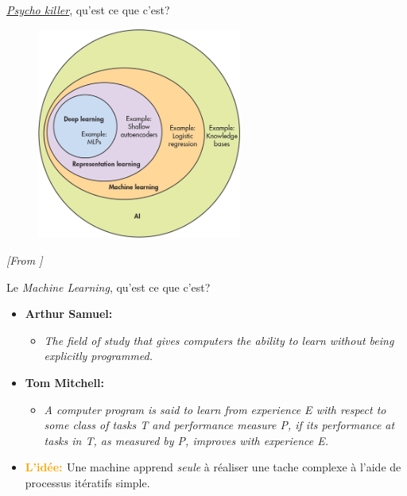 \documentclass[11pt]{beamer}
\begin{document}
\begin{frame}{\underline{\href{https://www.youtube.com/watch?v=O52jAYa4Pm8}{\textit{Psycho killer}}}, qu'est ce que c'est?}
  \begin{figure}
    \includegraphics[width=0.6\textwidth]{figs/aiVennDiagram.png}
  \end{figure}
  \tiny
  \vspace{-1cm}
  \textit{[From \href{http://www.deeplearningbook.org/}{\color{blue}{MIT Press book Deep Learning}}]}
\end{frame}


\begin{frame}{Le \textit{Machine Learning}, qu'est ce que c'est?}

  \begin{itemize}
  \item \textbf{Arthur Samuel:}
    \begin{itemize}
      \normalsize
    \item \textit{The field of study that gives computers the ability to learn without being explicitly programmed.}
    \end{itemize}
    \vspace{0.2cm}
  \item \textbf{Tom Mitchell:}
    \begin{itemize}
      \normalsize
    \item \textit{A computer program is said to learn from experience E with respect to some class of tasks T and performance measure P, if its performance at tasks in T, as measured by P, improves with experience E.}
    \end{itemize}
    \vspace{0.5cm}
  \item \textbf{\textcolor{orange}{L'idée: }} Une machine apprend \textit{seule} à réaliser une tache complexe à l'aide de processus itératifs simple.
  \end{itemize}
  
\end{frame}
\end{document}
